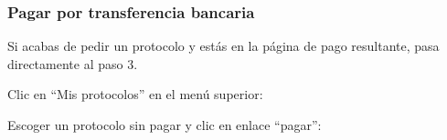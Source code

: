 \documentclass[12pt, spanish]{article}
\begin{document}
    \subsubsection{Pagar por transferencia bancaria}

    \label{sec:transfer}

        Si acabas de pedir un protocolo y estás en la página de pago resultante, pasa directamente
    al paso 3.

    \begin{steps}

        \item Clic en ``Mis protocolos'' en el menú superior:

            \medskip
            \begin{minipage}[t]{\linewidth}
            \raggedright
        \end{minipage}

        \item Escoger un protocolo sin pagar y clic en enlace ``pagar'':

            \medskip
            \begin{minipage}[t]{\linewidth}
            \raggedright
        \end{minipage}


\end{steps}
\end{document}

